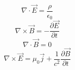\documentclass{beamer}
\begin{document}
{
}

{%
\begin{frame}\frametitle{}
	\begin{equation*}
      \nabla \cdot \overrightarrow{E} = \frac{\rho}{\epsilon_0}
    \end{equation*}
    \begin{equation*}
      \nabla \times \overrightarrow{B} = - \frac{\partial \overrightarrow{E}}{\partial t}
	\end{equation*}
	\begin{equation*}
	  \nabla \cdot \overrightarrow{B} = 0
	\end{equation*}
	\begin{equation*}
	  \nabla \times \overrightarrow{E} = \mu_0 \overrightarrow{j} + \frac{1}{c^{2}} \frac{\partial \overrightarrow{B}}{\partial t}
	\end{equation*}
\end{frame}
}
\end{document}
